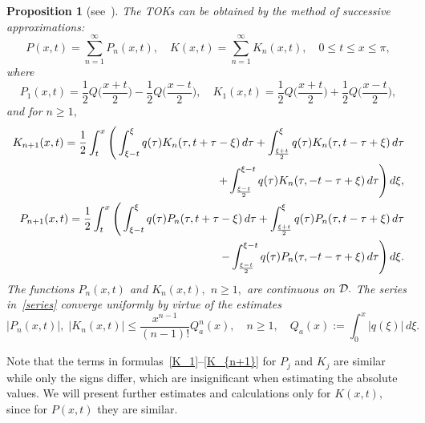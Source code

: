 \documentclass[a4paper, 12pt] {article}
\theoremstyle{plain}
\newtheorem{proposition}{\indent Proposition}
\theoremstyle{remark}
\theoremstyle{plain}
\theoremstyle{definition}
\numberwithin{equation}{section}
\begin{document}
\begin{proposition}[see~\cite{freil}]
The TOKs can be obtained by the method of successive approxi\-mations:
\begin{equation} \label{series}
P(x,t) = \sum_{n=1}^\infty P_n(x, t), \quad K(x, t) = \sum_{n=1}^\infty K_n(x, t),
\quad 0 \le t \le x \le \pi,
\end{equation}
where
\begin{equation} \label{K_1}
P_1(x,t) = \frac{1}{2}Q\Big(\frac{x+t}{2}\Big) -
\frac{1}{2}Q\Big(\frac{x-t}{2}\Big),
\quad
K_1(x,t)=\frac{1}{2}Q\Big(\frac{x+t}{2}\Big)+\frac{1}{2}
Q\Big(\frac{x-t}{2}\Big),
\end{equation}
and for $n \ge 1,$ 
\begin{equation} \label{K_{n+1}}
\begin{split}
K_{n+1}(x,t)=\frac{1}{2}\int_t^x
\Bigg( \int_{\xi-t}^\xi q(\tau)K_n(\tau,t+\tau-\xi)\,d\tau +\int_{\frac{\xi+t}{2}}^\xi q(\tau)K_n(\tau,t-\tau+\xi)\,d\tau
\\
+\int_{\frac{\xi-t}{2}}^{\xi-t}
q(\tau)K_n(\tau,-t-\tau+\xi)\,d\tau \Bigg)\,d\xi,
\\
P_{n+1}(x,t)=\frac{1}{2}\int_t^x
\Bigg( \int_{\xi-t}^\xi q(\tau)P_n(\tau,t+\tau-\xi)\,d\tau +\int_{\frac{\xi+t}{2}}^\xi q(\tau)P_n(\tau,t-\tau+\xi)\,d\tau
\\
-
\int_{\frac{\xi-t}{2}}^{\xi-t}q(\tau)
P_n(\tau,-t-\tau+\xi)\,d\tau \Bigg)\,d\xi.
\end{split}
\end{equation}
The functions $P_{n}(x, t)$ and $K_{n}(x, t),$ $n \ge 1,$ are continuous on ${\cal D}.$
The series in~\eqref{series} converge uniformly by virtue of the estimates
\begin{equation}\label{K_n}
|P_n(x,t)|, \; |K_n(x,t)|\le \frac{x^{n-1}}{(n-1)!} Q^n_a(x), \quad n \ge 1, \quad Q_a(x) := \int_0^x |q(\xi)|\,d\xi.
\end{equation}
\end{proposition}

Note that the terms in formulas~\eqref{K_1}--\eqref{K_{n+1}} for $P_j$ and $K_j$ are similar while only the signs differ, which are insignificant when estimating the absolute values. We will present further estimates and calculations only for $K(x, t),$ since for $P(x, t)$ they are similar.
\end{document}
